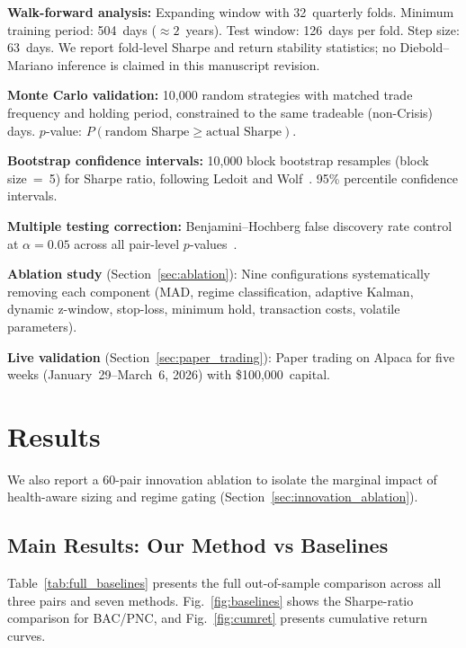 \documentclass{ieeeaccess}
\begin{document}
\textbf{Walk-forward analysis:}
Expanding window with 32~quarterly folds.
Minimum training period: 504~days ($\approx 2$~years).
Test window: 126~days per fold.
Step size: 63~days.
We report fold-level Sharpe and return stability statistics; no Diebold--Mariano inference is claimed in this manuscript revision.

\textbf{Monte Carlo validation:}
10{,}000 random strategies with matched trade frequency and holding period, constrained to the same tradeable (non-Crisis) days.
$p$-value: $P(\text{random Sharpe} \geq \text{actual Sharpe})$.

\textbf{Bootstrap confidence intervals:}
10{,}000 block bootstrap resamples (block size~=~5) for Sharpe ratio, following Ledoit and Wolf~\cite{ledoit2008robust}.
95\% percentile confidence intervals.

\textbf{Multiple testing correction:}
Benjamini--Hochberg false discovery rate control at $\alpha = 0.05$ across all pair-level $p$-values~\cite{benjamini1995controlling}.

\textbf{Ablation study} (Section~\ref{sec:ablation}):
Nine configurations systematically removing each component (MAD, regime classification, adaptive Kalman, dynamic z-window, stop-loss, minimum hold, transaction costs, volatile parameters).

\textbf{Live validation} (Section~\ref{sec:paper_trading}):
Paper trading on Alpaca for five weeks (January~29--March~6, 2026) with \$100{,}000~capital.

\section{Results}
\label{sec:results}

We also report a 60-pair innovation ablation to isolate the marginal impact of health-aware sizing and regime gating (Section~\ref{sec:innovation_ablation}).

\subsection{Main Results: Our Method vs Baselines}
\label{sec:baselines_results}

Table~\ref{tab:full_baselines} presents the full out-of-sample comparison across all three pairs and seven methods.
Fig.~\ref{fig:baselines} shows the Sharpe-ratio comparison for BAC/PNC, and Fig.~\ref{fig:cumret} presents cumulative return curves.
\end{document}
